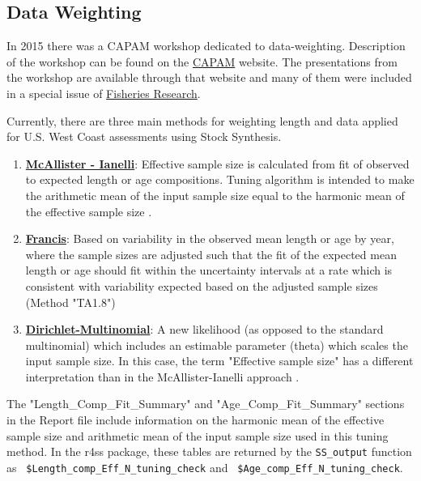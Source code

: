 \subsection{Data Weighting}
\label{sec:DataWeight}
\hypertarget{DataWeight}{}


In 2015 there was a CAPAM workshop dedicated to data-weighting. Description of the workshop can be found on the \href{http://capamresearch.org/data-weighting/workshop}{CAPAM} website. The presentations from the workshop are available through that website and many of them were included in a special issue of \href{https://sciencedirect.com/journal/fisheries-research/vol/192}{Fisheries Research}.

Currently, there are three main methods for weighting length and data applied for U.S. West Coast assessments using Stock Synthesis.

\begin{enumerate}
	\item \hyperlink{MI}{\textbf{McAllister - Ianelli}}: Effective sample size is calculated from fit of observed to expected length or age compositions. Tuning algorithm is intended to make the arithmetic mean of the input sample size equal to the harmonic mean of the effective sample size \citep{mcallister-bayesian-1997}.
	
	\item \hyperlink{Francis}{\textbf{Francis}}: Based on variability in the observed mean length or age by year, where the sample sizes are adjusted such that the fit of the expected mean length or age should fit within the uncertainty intervals at a rate which is consistent with variability expected based on the adjusted sample sizes (Method "TA1.8") \citep{francis-data-2011}
	
	\item \hyperlink{DM}{\textbf{Dirichlet-Multinomial}}: A new likelihood (as opposed to the standard multinomial) which includes an estimable parameter (theta) which scales the input sample size. In this case, the term "Effective sample size" has a different interpretation than in the McAllister-Ianelli approach \citep{thorson-model-based-2017}.
\end{enumerate}


\hypertarget{MI}{}
The "Length\_Comp\_Fit\_Summary" and "Age\_Comp\_Fit\_Summary" sections in the Report file include information on the harmonic mean of the effective sample size and arithmetic mean of the input sample size used in this tuning method. In the r4ss package, these tables are returned by the \texttt{SS\_output} function as \texttt{ \$Length\_comp\_Eff\_N\_tuning\_check} and \texttt{ \$Age\_comp\_Eff\_N\_tuning\_check}.

